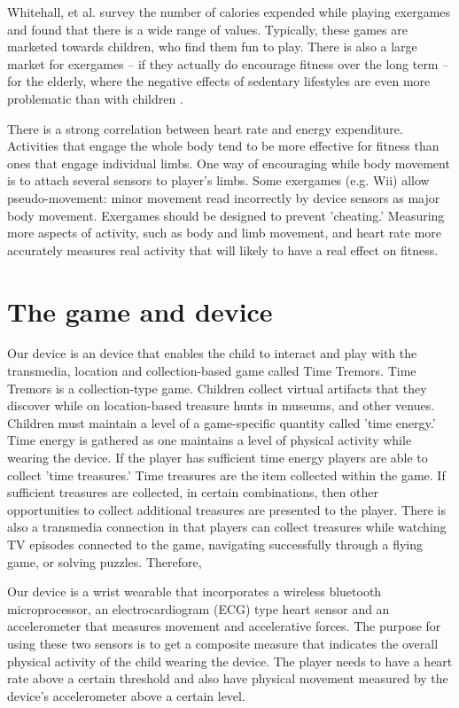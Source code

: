 \documentclass{SIGCHI2015LaTex/sigchi}
\begin{document}
Whitehall, et al. survey the number of calories expended while playing exergames and found that there is a wide range of values. Typically, these games are marketed towards children, who find them fun to play. There is also a large market for exergames -- if they actually do encourage fitness over the long term -- for the elderly, where the negative effects of sedentary lifestyles are even more problematic than with children \cite{vonstad2014exergaming}.

There is a strong correlation between heart rate and energy expenditure\cite{whitehead2010exergame}. Activities that engage the whole body tend to be more effective for fitness than ones that engage individual limbs. One way of encouraging while body movement is to attach several sensors to player's limbs. Some exergames (e.g. Wii) allow pseudo-movement: minor movement read incorrectly by device sensors as major body movement. Exergames should be designed to prevent 'cheating.' Measuring more aspects of activity, such as body and limb movement, and heart rate more accurately measures real activity that will likely to have a real effect on fitness.  

\section{The game and device}
Our device is an device that enables the child to interact and play with the transmedia, location and collection-based game called Time Tremors. Time Tremors is a collection-type game. Children collect virtual artifacts that they discover while on location-based treasure hunts in museums, and other venues. Children must maintain a level of a game-specific quantity called 'time energy.' Time energy is gathered as one maintains a level of physical activity while wearing the device. If the player has sufficient time energy players are able to collect 'time treasures.' Time treasures are the item collected within the game. If sufficient treasures are collected, in certain combinations, then other opportunities to collect additional treasures are presented to the player. There is also a transmedia connection in that players can collect treasures while watching TV episodes connected to the game, navigating successfully through a flying game, or solving puzzles. Therefore,  

Our device is a wrist wearable that incorporates a wireless bluetooth microprocessor, an electrocardiogram (ECG) type heart sensor and an accelerometer that measures movement and accelerative forces. The purpose for using these two sensors is to get a composite measure that indicates the overall physical activity of the child wearing the device. The player needs to have a heart rate above a certain threshold and also have physical movement measured by the device's accelerometer above a certain level. 
\end{document}

